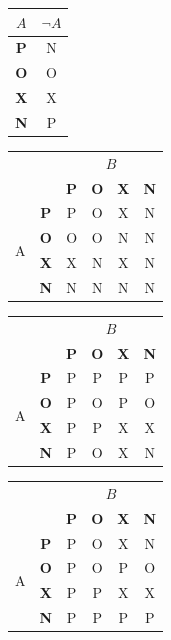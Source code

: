 \documentclass[a4paper, 11pt]{article}
\begin{document}
\begin{center}
    \begin{table}[h]
	    \centering
    	\begin{tabular}{|c|c|}
    		\hline
    		$A$ & $\neg{A}$\\
    		\hline
    		\textbf{P} & N\\
    		\hline
    		\textbf{O} & O\\
    		\hline
    		\textbf{X} & X\\
    		\hline
    		\textbf{N} & P\\
    		\hline
    	\end{tabular}
    	\begin{tabular}{|c|c|c|c|c|c|}
    		\hline
    		\multicolumn{2}{|c|}{ \multirow{2}{*}{$A \wedge B$}} & \multicolumn{4}{c|}{$B$}\\
    		\cline{3-6}
    		\multicolumn{2}{|c|}{~} & \textbf{P} & \textbf{O} & \textbf{X} & \textbf{N}\\
    		\hline
    		\multirow{4}{*}{A} & \textbf{P} & P & O & X & N\\
    		\cline{2-6}
    		~ & \textbf{O} & O & O & N & N\\
    		\cline{2-6}
    		~ & \textbf{X} & X & N & X & N\\
    		\cline{2-6}
    		~ & \textbf{N} & N & N & N & N\\
    		\hline
    	\end{tabular}
    	\begin{tabular}{|c|c|c|c|c|c|}
    		\hline
    		\multicolumn{2}{|c|}{ \multirow{2}{*}{$A \vee B$}} & \multicolumn{4}{c|}{$B$}\\
    		\cline{3-6}
    		\multicolumn{2}{|c|}{~} & \textbf{P} & \textbf{O} & \textbf{X} & \textbf{N}\\
    		\hline
    		\multirow{4}{*}{A} & \textbf{P} & P & P & P & P\\
    		\cline{2-6}
    		~ & \textbf{O} & P & O & P & O\\
    		\cline{2-6}
    		~ & \textbf{X} & P & P & X & X\\
    		\cline{2-6}
    		~ & \textbf{N} & P & O & X & N\\
    		\hline
    	\end{tabular}
    	\begin{tabular}{|c|c|c|c|c|c|}
    		\hline
    		\multicolumn{2}{|c|}{ \multirow{2}{*}{$A \rightarrow B$}} & \multicolumn{4}{c|}{$B$}\\
    		\cline{3-6}
    		\multicolumn{2}{|c|}{~} & \textbf{P} & \textbf{O} & \textbf{X} & \textbf{N}\\
    		\hline
    		\multirow{4}{*}{A} & \textbf{P} & P & O & X & N\\
    		\cline{2-6}
    		~ & \textbf{O} & P & O & P & O\\
    		\cline{2-6}
    		~ & \textbf{X} & P & P & X & X\\
		    \cline{2-6}
		    ~ & \textbf{N} & P & P & P & P\\
		    \hline
	    \end{tabular}


\end{table}
\end{center}
\end{document}
